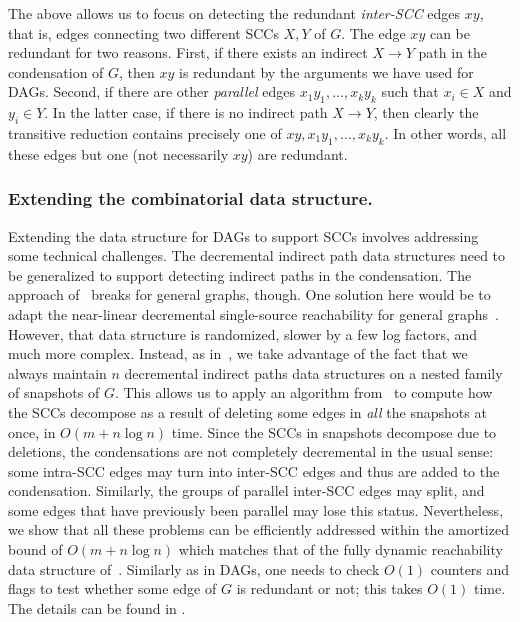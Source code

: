 \documentclass[11pt]{article}
\newcommand{\arxivVsConference}[2]{#1}
\begin{document}
The above allows us to focus on detecting the redundant \emph{inter-SCC} edges $xy$, that is, edges connecting two different SCCs $X,Y$ of $G$. The edge $xy$ can be redundant for two reasons. First, if there exists an indirect $X\to Y$ path in the condensation of $G$,
then $xy$ is redundant by the arguments we have used for DAGs.
Second, if there are other \emph{parallel} edges
$x_1y_1,\ldots,x_ky_k$ such that $x_i\in X$ and $y_i\in Y$.
In the latter case, if there is no indirect path \( X \rightarrow Y \), then clearly the transitive reduction
contains precisely one of $xy,x_1y_1,\ldots,x_ky_k$. In other words, all these edges but one (not necessarily $xy$) are redundant.

\subsubsection{Extending the combinatorial data structure.}
Extending the data structure for DAGs to support SCCs involves addressing some technical challenges.
The decremental indirect path data structures need to be generalized to support detecting indirect paths in the condensation.
The approach of~\cite{Italiano:1988aa} breaks for general graphs, though.
One solution here would be to adapt the near-linear decremental single-source reachability for general graphs~\cite{BernsteinPW19}.
However, that data structure is randomized, slower by a few log factors, and much more complex.
 Instead, as in~\cite{RodittyZ08,Roditty:2016aa}, we take advantage of the fact that we always maintain $n$ decremental indirect paths data structures on a nested family of snapshots of $G$. 
 This allows us to apply an algorithm from~\cite{Roditty:2016aa} to compute how the SCCs decompose as a result of deleting some edges in \emph{all} the snapshots at once, in $O(m+n\log{n})$ time. 
Since the SCCs in snapshots decompose due to deletions, the condensations are not completely decremental in the usual sense: some intra-SCC edges may turn into inter-SCC edges and thus are added to the condensation.
Similarly, the groups of parallel inter-SCC edges may split, and some edges that have previously been parallel may lose this status. 
Nevertheless, we show that all these problems can be efficiently addressed within the amortized bound of $O(m+n\log{n})$ which matches that of the fully dynamic reachability data structure of~\cite{Roditty:2016aa}. Similarly as in DAGs, one needs to check $O(1)$ counters and flags to test whether some edge of $G$ is redundant or not; this takes $O(1)$ time. The details can be found in \arxivVsConference{}{Appendix~\ref{subsec:combinatorial_general}}.
\end{document}
